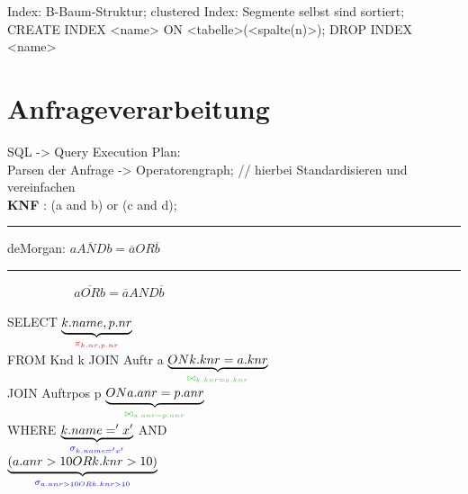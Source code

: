 Index: B-Baum-Struktur; clustered Index: Segmente selbst sind sortiert;  
CREATE INDEX <name> ON 	<tabelle>(<spalte(n)>); DROP INDEX <name>

\section{Anfrageverarbeitung}

SQL -> Query Execution Plan:\\
Parsen der Anfrage -> Operatorengraph; // hierbei Standardisieren und vereinfachen  \\
\textbf{KNF} : (a and b) or (c and d); \\
\rule{2em}{0em}deMorgan: $\overline{a AND b} = \overline{a} OR \overline{b}$\\
\rule{2em}{0em}\textcolor{white}{deMorgan :} $\overline{a OR b} = \overline{a} AND \overline{b}$\\

\newcommand{\proj}{\textcolor{red}{\ensuremath{\pi_{k.nr,p.nr}}}}
\newcommand{\joink}{\textcolor{darkgreen}{\ensuremath{\bowtie_{k.knr = a.knr}}}}
\newcommand{\joina}{\textcolor{darkgreen}{\ensuremath{\bowtie_{a.anr = p.anr}}}}
\newcommand{\selk}{\textcolor{blue}{\ensuremath{\sigma_{k.name = 'x'}} }}
\newcommand{\selor}{\textcolor{blue}{\ensuremath{\sigma_{a.anr > 10 OR k.knr >10 }}}}
\newcommand{\grpi}[1]{\textcolor{gray}{ \ensuremath{\pi_{ #1 }} }}

\begin{minipage}{0.25\textwidth}
SELECT $\underbrace{k.name, p.nr}_{ \proj }$ \\
FROM Knd k JOIN Auftr a $\underbrace{ ON k.knr = a.knr}_{\joink}$ \\
JOIN Auftrpos p $\underbrace{ ON a.anr =p.anr}_{\joina} $\\
WHERE $\underbrace{k.name = 'x'}_{\selk}$ AND\\
$\underbrace{(a.anr > 10 OR k.knr >10)}_{\selor}$
\end{minipage}
% 
\begin{minipage}{0.25\textwidth}
\end{minipage}

